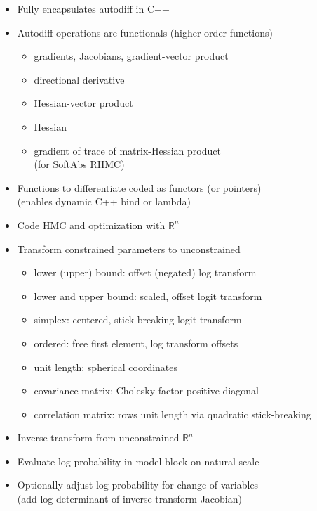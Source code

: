 \documentclass[10pt]{report}
\begin{document}
\begin{itemize}
\item Fully encapsulates autodiff in C++
\item Autodiff operations are functionals {\footnotesize (higher-order functions)}
  \begin{itemize}\small
  \item gradients, Jacobians, gradient-vector product
  \item directional derivative
  \item Hessian-vector product
  \item Hessian
  \item gradient of trace of matrix-Hessian product
    \\ {\footnotesize (for SoftAbs RHMC)}
  \end{itemize}
\item Functions to differentiate coded as functors (or pointers)
  \\ {\footnotesize (enables dynamic C++ bind or lambda)}
\end{itemize}

\begin{itemize}
\item Code HMC and optimization with $\mathbb{R}^n$ 
\item Transform constrained parameters to unconstrained
  \vspace*{-2pt}
  {\small
    \begin{itemize}
    \item lower (upper) bound: offset (negated) log transform
    \item lower and upper bound: scaled, offset logit transform
    \item simplex: centered, stick-breaking logit transform
    \item ordered: free first element, log transform offsets
    \item unit length: spherical coordinates
    \item covariance matrix: Cholesky factor positive diagonal 
    \item correlation matrix: rows unit length via quadratic stick-breaking
    \end{itemize}
  }
\end{itemize}


\begin{itemize}
\item Inverse transform from unconstrained $\mathbb{R}^n$
\item Evaluate log probability in model block on natural scale
\item Optionally adjust log probability for change of variables
  \\ {\footnotesize (add log determinant of inverse transform Jacobian)}
\end{itemize}
\end{document}
